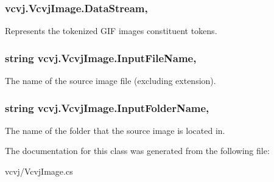 \subsubsection[{\texorpdfstring{Data\+Stream}{DataStream}}]{ vcvj.\+Vcvj\+Image.\+Data\+Stream\hspace{0.3cm}{\ttfamily [get]}, {\ttfamily [set]}}\hypertarget{classvcvj_1_1_vcvj_image_af7be319d59a08f70d624631d8f1bccbd}{}\label{classvcvj_1_1_vcvj_image_af7be319d59a08f70d624631d8f1bccbd}


Represents the tokenized G\+IF image\textquotesingle{}s constituent tokens. 

\subsubsection[{\texorpdfstring{Input\+File\+Name}{InputFileName}}]{\setlength{\rightskip}{0pt plus 5cm}string vcvj.\+Vcvj\+Image.\+Input\+File\+Name\hspace{0.3cm}{\ttfamily [get]}, {\ttfamily [set]}}\hypertarget{classvcvj_1_1_vcvj_image_a34afafb554b739cd21a3ad8b71007462}{}\label{classvcvj_1_1_vcvj_image_a34afafb554b739cd21a3ad8b71007462}


The name of the source image file (excluding extension). 

\subsubsection[{\texorpdfstring{Input\+Folder\+Name}{InputFolderName}}]{\setlength{\rightskip}{0pt plus 5cm}string vcvj.\+Vcvj\+Image.\+Input\+Folder\+Name\hspace{0.3cm}{\ttfamily [get]}, {\ttfamily [set]}}\hypertarget{classvcvj_1_1_vcvj_image_a2a21889ea8a2dac7832e69b224e47732}{}\label{classvcvj_1_1_vcvj_image_a2a21889ea8a2dac7832e69b224e47732}


The name of the folder that the source image is located in. 



The documentation for this class was generated from the following file\+:\begin{DoxyCompactItemize}
\item 
vcvj/Vcvj\+Image.\+cs\end{DoxyCompactItemize}

